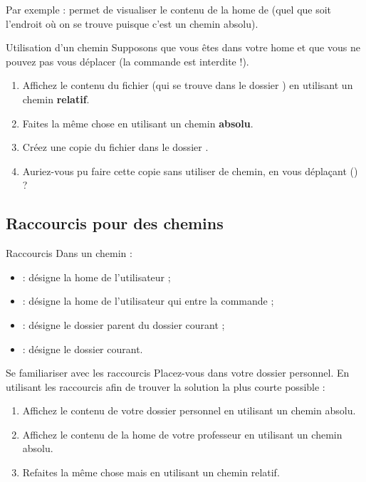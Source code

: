 \documentclass[a4paper,11pt]{style-esi/td}
\begin{document}
		Par exemple : 
		permet de visualiser le contenu de la home de 
		(quel que soit l'endroit où on se trouve puisque c'est un chemin absolu).
		
		\begin{Exercice}{Utilisation d'un chemin}
			Supposons que vous êtes dans votre home 
			et que vous ne pouvez pas vous déplacer 
			(la commande  est interdite !).
			\begin{enumerate}
			\item 
				Affichez le contenu du fichier 
				(qui se trouve dans le dossier )
				en utilisant un chemin \textbf{relatif}.
			\item 
				Faites la même chose 
				en utilisant un chemin \textbf{absolu}.
			\item
				Créez une copie du fichier  
				dans le dossier .
			\item 
				Auriez-vous pu faire cette copie 
				sans utiliser de chemin,
				en vous déplaçant () ?
			\end{enumerate}
		\end{Exercice}

	\subsection{Raccourcis pour des chemins}

		\begin{theorie}{Raccourcis}
			Dans un chemin :
			\begin{itemize}
			\item {} : désigne la home de l'utilisateur  ;
			\item \samp{\textasciitilde{}} : désigne la home de l'utilisateur qui entre la commande ;
			\item {} : désigne le dossier parent du dossier courant ;
			\item {} : désigne le dossier courant.
			\end{itemize}
		\end{theorie}

		\begin{Exercice}{Se familiariser avec les raccourcis}
			Placez-vous dans votre dossier personnel.
			En utilisant les raccourcis 
			afin de trouver la solution la plus courte possible :
			\begin{enumerate}
			\item Affichez le contenu de votre dossier personnel
				en utilisant un chemin absolu.
			\item Affichez le contenu de la home de votre professeur
				en utilisant un chemin absolu.
			\item Refaites la même chose mais en utilisant un chemin relatif.
			\end{enumerate}
		\end{Exercice}
\end{document}
